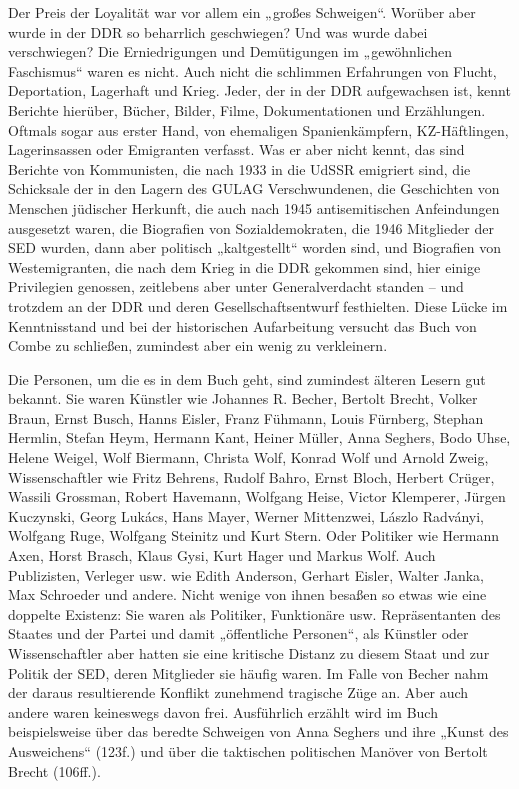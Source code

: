 \begin{multicols*}{2}
    Der Preis der Loyalität war vor allem ein „großes Schweigen“. Worüber aber wurde in der DDR so beharrlich geschwiegen? Und was wurde dabei verschwiegen? Die Erniedrigungen und Demütigungen im „gewöhnlichen Faschismus“ waren es nicht. Auch nicht die schlimmen Erfahrungen von Flucht, Deportation, Lagerhaft und Krieg. Jeder, der in der DDR aufgewachsen ist, kennt Berichte hierüber, Bücher, Bilder, Filme, Dokumentationen und Erzählungen. Oftmals sogar aus erster Hand, von ehemaligen Spanienkämpfern, KZ-Häftlingen, Lagerinsassen oder Emigranten verfasst. Was er aber nicht kennt, das sind Berichte von Kommunisten, die nach 1933 in die UdSSR emigriert sind, die Schicksale der in den Lagern des GULAG Verschwundenen, die Geschichten von Menschen jüdischer Herkunft, die auch nach 1945 antisemitischen Anfeindungen ausgesetzt waren, die Biografien von Sozialdemokraten, die 1946 Mitglieder der SED wurden, dann aber politisch „kaltgestellt“ worden sind, und Biografien von Westemigranten, die nach dem Krieg in die DDR gekommen sind, hier einige Privilegien genossen, zeitlebens aber unter Generalverdacht standen – und trotzdem an der DDR und deren Gesellschaftsentwurf festhielten. Diese Lücke im Kenntnisstand und bei der historischen Aufarbeitung versucht das Buch von Combe zu schließen, zumindest aber ein wenig zu verkleinern. 

    Die Personen, um die es in dem Buch geht, sind zumindest älteren Lesern gut bekannt. Sie waren Künstler wie Johannes R. Becher, Bertolt Brecht, Volker Braun, Ernst Busch, Hanns Eisler, Franz Fühmann, Louis Fürnberg, Stephan Hermlin, Stefan Heym, Hermann Kant, Heiner Müller, Anna Seghers, Bodo Uhse, Helene Weigel, Wolf Biermann, Christa Wolf, Konrad Wolf und Arnold Zweig, Wissenschaftler wie Fritz Behrens, Rudolf Bahro, Ernst Bloch, Herbert Crüger, Wassili Grossman, Robert Havemann, Wolfgang Heise, Victor Klemperer, Jürgen Kuczynski, Georg Lukács, Hans Mayer, Werner Mittenzwei, Lászlo Radványi, Wolfgang Ruge, Wolfgang Steinitz und Kurt Stern. Oder Politiker wie Hermann Axen, Horst Brasch, Klaus Gysi, Kurt Hager und Markus Wolf. Auch Publizisten, Verleger usw. wie Edith Anderson, Gerhart Eisler, Walter Janka, Max Schroeder und andere. Nicht wenige von ihnen besaßen so etwas wie eine doppelte Existenz: Sie waren als Politiker, Funktionäre usw. Repräsentanten des Staates und der Partei und damit „öffentliche Personen“, als Künstler oder Wissenschaftler aber hatten sie eine kritische Distanz zu diesem Staat und zur Politik der SED, deren Mitglieder sie häufig waren. Im Falle von Becher nahm der daraus resultierende Konflikt zunehmend tragische Züge an. Aber auch andere waren keineswegs davon frei. Ausführlich erzählt wird im Buch beispielsweise über das beredte Schweigen von Anna Seghers und ihre „Kunst des Ausweichens“ (123f.) und über die taktischen politischen Manöver von Bertolt Brecht (106ff.). 


\end{multicols*}
